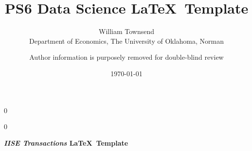 \documentclass[12pt]{article}
\newcommand{\blind}{0}
\begin{document}
		
		\def\spacingset#1{\renewcommand{\baselinestretch}%
			{#1}\small\normalsize} \spacingset{1}
		
		\blind
		{
			\title{\bf PS6 Data Science}
			
			\author{ William Townsend  \\
			Department of Economics, The University of Oklahoma, Norman\\
             }
			\date{\today}
			\maketitle
		} \fi
		
		\blind
		{

            \title{\bf \emph{} \LaTeX \ Template}
			\author{Author information is purposely removed for double-blind review}
			
\bigskip
			\bigskip
			\bigskip
			\begin{center}
				{\LARGE\bf \emph{IISE Transactions} \LaTeX \ Template}
			\end{center}
			\medskip
		} \fi
		\bigskip
		
%		
%			
%
\end{document}
